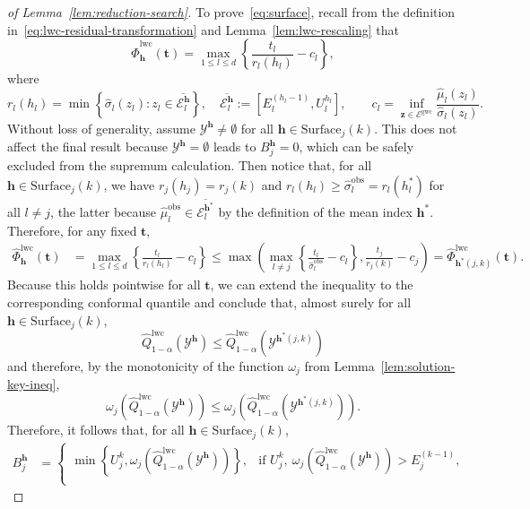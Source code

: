 \begin{proof}[of Lemma~\ref{lem:reduction-search}]
To prove~\eqref{eq:surface}, recall from the definition in~\eqref{eq:lwc-residual-transformation} and Lemma~\ref{lem:lwc-rescaling} that
\[
\hat{\Phi}^{\mathrm{lwc}}_{\mathbf{h}}(\mathbf t)  = \max_{1\leq l \leq d} \left\{\frac{t_l}{r_l(h_l)} - c_l\right\},
\]
where
\[
r_l(h_l) = \min\left\{\hat{\sigma}_l(z_l): z_l \in \overline{\mathcal{E}^{\mathbf{h}}_l}\right\},
\quad \overline{\mathcal{E}^{\mathbf{h}}_l} := \left[E^{(h_l-1)}_l, U^{h_l}_l\right],
\qquad c_l = \inf_{\mathbf z \in \mathcal{E}^{\mathrm{gwc}}}\frac{\hat{\mu}_l(z_l)}{\hat{\sigma}_l(z_l)}.
\]
Without loss of generality, assume $\mathcal{Y}^{\mathbf{h}} \neq \emptyset$ for all $\mathbf{h} \in \mathrm{Surface}_j(k)$. This does not affect the final result because $\mathcal{Y}^{\mathbf{h}} = \emptyset$ leads to $B^{\mathbf{h}}_j = 0$, which can be safely excluded from the supremum calculation. Then notice that, for all $\mathbf{h} \in \mathrm{Surface}_j(k)$, we have $r_j(h_j) = r_j(k)$ and $r_l(h_l) \geq \hat{\sigma}^\mathrm{obs}_l = r_l({h^*_l})$ for all $l \neq j$, the latter because $\hat{\mu}^\mathrm{obs}_l \in \overline{\mathcal{E}^{\mathbf{h}^*}_l}$ by the definition of the mean index $\mathbf{h}^*$. Therefore, for any fixed $\mathbf t$,
\begin{align*}
    \hat{\Phi}^{\mathrm{lwc}}_{\mathbf{h}}(\mathbf t) & = \max_{1\leq l \leq d} \left\{\frac{t_l}{r_l(h_l)} - c_l\right\}
    \leq  \max\left(\max_{l\neq j} \left\{\frac{t_l}{\hat{\sigma}^\mathrm{obs}_l} - c_l\right\}, \frac{t_j}{r_j(k)} - c_j\right)
    = \hat{\Phi}^{\mathrm{lwc}}_{\mathbf{h}^*(j,k)}(\mathbf t).
\end{align*}
Because this holds pointwise for all $\mathbf t$, we can extend the inequality to the corresponding conformal quantile and conclude that, almost surely for all $\mathbf{h} \in \mathrm{Surface}_j(k)$,
\[
\hat{Q}^\mathrm{lwc}_{1-\alpha}(\mathcal{Y}^{\mathbf{h}}) \leq \hat{Q}^\mathrm{lwc}_{1-\alpha}(\mathcal{Y}^{\mathbf{h}^*(j,k)})
\]
and therefore, by the monotonicity of the function $\omega_j$ from Lemma~\ref{lem:solution-key-ineq},
\[
\omega_j(\hat{Q}^\mathrm{lwc}_{1-\alpha}(\mathcal{Y}^{\mathbf{h}})) \leq \omega_j(\hat{Q}^\mathrm{lwc}_{1-\alpha}(\mathcal{Y}^{\mathbf{h}^*(j,k)})).
\]
Therefore, it follows that, for all $\mathbf{h} \in \mathrm{Surface}_j(k)$,
\begin{align*}
B^{\mathbf{h}}_j &=\begin{cases}
\min\left\{U^{k}_j, \omega_j(\hat{Q}^{\mathrm{lwc}}_{1-\alpha}(\mathcal{Y}^{\mathbf{h}}))\right\}, 
& \text{if } U^{k}_j,\ \omega_j(\hat{Q}^{\mathrm{lwc}}_{1-\alpha}(\mathcal{Y}^{\mathbf{h}})) > E^{(k-1)}_j,\\[0.4em]

\end{cases}
\end{align*}
\end{proof}
